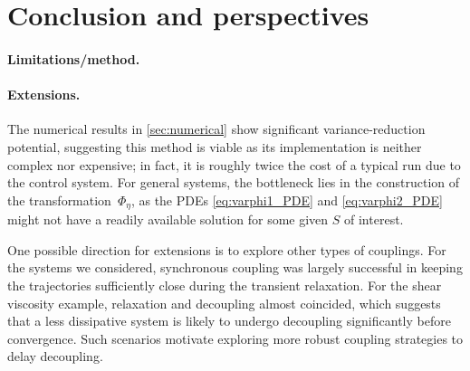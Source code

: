 \section{Conclusion and perspectives}
\label{sec:conclusion}
%
\paragraph{Limitations/method.} 

\paragraph{Extensions.} 

The numerical results in \cref{sec:numerical} show significant variance-reduction potential, suggesting this method is viable as its implementation is neither complex nor expensive; in fact, it is roughly twice the cost of a typical run due to the control system. For general systems, the bottleneck lies in the construction of the transformation~$\Phi_\eta$, as the PDEs \eqref{eq:varphi1_PDE} and \eqref{eq:varphi2_PDE} might not have a readily available solution for some given $S$ of interest. 

One possible direction for extensions is to explore other types of couplings. For the systems we considered, synchronous coupling was largely successful in keeping the trajectories sufficiently close during the transient relaxation. For the shear viscosity example, relaxation and decoupling almost coincided, which suggests that a less dissipative system is likely to undergo decoupling significantly before convergence. Such scenarios motivate exploring more robust coupling strategies to delay decoupling.


